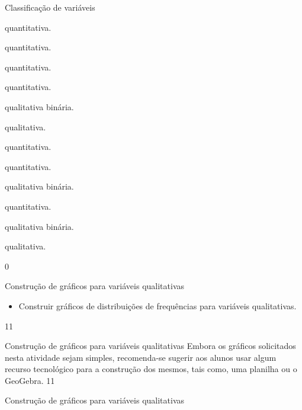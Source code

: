 {\begin{answer}{Classificação de variáveis}
{\begin{enumerate}
\begin{multicols}{3}
 \item quantitativa.
 \item quantitativa.
 \item quantitativa.
 \item quantitativa. 
 \item qualitativa binária.
 \item qualitativa.
 \item quantitativa. 
 \item quantitativa.
 \item qualitativa binária.
 \item quantitativa.
 \item qualitativa binária.
 \item qualitativa.
 \end{multicols}
\end{enumerate}
}{0}
\end{answer}
\clearmargin
\begin{objectives}{Construção de gráficos para variáveis qualitativas}
{
\begin{itemize}
\item Construir gráficos de distribuições de frequências para variáveis qualitativas.
\end{itemize}
}{1}{1}
\end{objectives}
\begin{sugestions}{Construção de gráficos para variáveis qualitativas}
{
Embora os gráficos solicitados nesta atividade sejam simples, recomenda-se sugerir aos alunos usar algum recurso tecnológico para a construção dos mesmos, tais como, uma planilha ou o GeoGebra.
}{1}{1}
\end{sugestions}
\begin{answer}{Construção de gráficos para variáveis qualitativas}
{
\begin{figure}[H]
\centering


\end{figure}}
\end{answer}}

